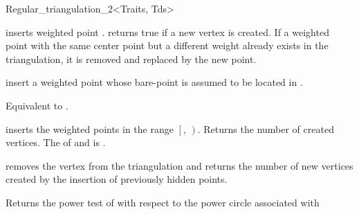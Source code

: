 \begin{ccClassTemplate}{Regular_triangulation_2<Traits, Tds>}

{inserts  weighted point .
returns true if a new vertex is created. 
If a weighted point with the same center point but a 
different weight already exists in the triangulation, 
it is removed and replaced by the new point.
}

{insert a weighted point  whose bare-point is assumed to be
located in  .}

{Equivalent to .}

{inserts the weighted points in the range
 $\left[\right.$, $\left.\right)$.
 Returns the number of created vertices.
 \ccPrecond The  of  and 
 is .}

{removes the vertex from the triangulation and
returns the number of new vertices created by the insertion of previously
hidden points.}








\ccThreeToTwo

{Returns the power test of   with respect to the 
power circle  associated with }




\end{ccClassTemplate}
